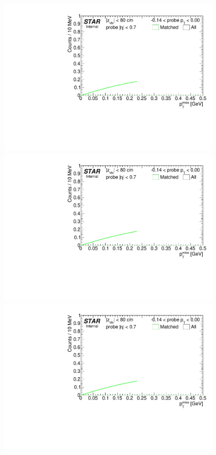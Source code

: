 \begin{figure}[h!]
{}~
\parbox{0.495\textwidth}{
  \centering
  \includegraphics[width=\linewidth,page=4]{graphics/systematicsEfficiency/TOF_tagAndProbe/Fitting_effVsPt_mc.pdf}\\
  \includegraphics[width=\linewidth,page=5]{graphics/systematicsEfficiency/TOF_tagAndProbe/Fitting_effVsPt_mc.pdf}\\
  \includegraphics[width=\linewidth,page=6]{graphics/systematicsEfficiency/TOF_tagAndProbe/Fitting_effVsPt_mc.pdf}

}%
\end{figure}
